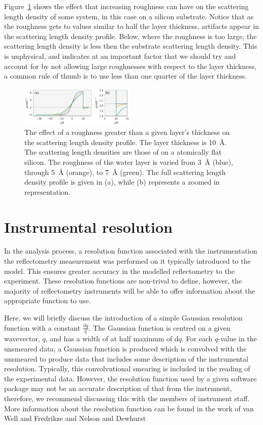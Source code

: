 \documentclass[
 reprint,
 superscriptaddress,
 amsmath,amssymb,
 aps,
]{revtex4-1}
\newcommand{\angstrom}{\rm{\AA}}
\begin{document}
Figure~\ref{fig:rough} shows the effect that increasing roughness can have on the scattering length density of some system, in this case  on a silicon substrate. 
Notice that as the roughness gets to values similar to half the layer thickness, artifacts appear in the scattering length density profile. 
Below, where the roughness is too large, the scattering length density is less then the substrate scattering length density. 
This is unphysical, and indicates at an important factor that we should try and account for by not allowing large roughnesses with respect to the layer thickness, a common rule of thumb is to use less than one quarter of the layer thickness. 
%
\begin{figure}[t]
    \includegraphics[width=0.49\textwidth]{roughness}
    \caption{The effect of a roughness greater than a given layer's thickness on the scattering length density profile. The layer thickness is \SI{10}{\angstrom}. The scattering length densities are those of  on a atomically flat silicon. The roughness of the water layer is varied from \SI{3}{\angstrom} (blue), through \SI{5}{\angstrom} (orange), to \SI{7}{\angstrom} (green). The full scattering length density profile is given in (a), while (b) represents a zoomed in representation.}
    \label{fig:rough}
\end{figure}
%

\section{Instrumental resolution}
In the analysis process, a resolution function associated with the instrumentation the reflectometry measurement was performed on it typically introduced to the model. 
This ensures greater accuracy in the modelled reflectometry to the experiment. 
These resolution functions are non-trival to define, however, the majority of reflectometry instruments will be able to offer information about the appropriate function to use. 

Here, we will briefly discuss the introduction of a simple Gaussian resolution function with a constant $\frac{\text{d}q}{q}$. 
The Gaussian function is centred on a given wavevector, $q$, and has a width of at half maximum of $\text{d}q$.
For each $q$-value in the unsmeared data, a Gaussian function is produced which is convolved with the unsmeared to produce data that includes some description of the instrumental resolution.
Typically, this convolvutional smearing is included in the reading of the experimental data. 
However, the resolution function used by a given software package may not be an accurate description of that from the instrument, therefore, we recommend discussing this with the members of instrument staff. 
More information about the resolution function can be found in the work of van Well and Fredrikze \cite{vanwell_resolution_2005} and Nelson and Dewhurst \cite{nelson_towards_2013,nelson_towards_2014}
\end{document}
